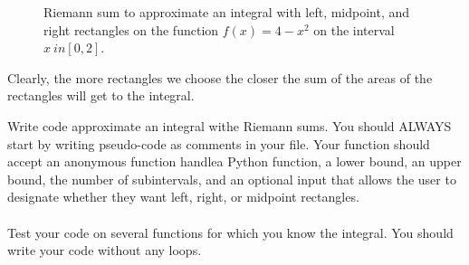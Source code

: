 \begin{figure}[ht!]
    \begin{center}
    \end{center}
    \caption{Riemann sum to approximate an integral with left, midpoint, and right
    rectangles on the function $f(x) = 4 - x^2$ on the interval $x \ in [0,2]$.}
    \label{fig:integral_with_rectangles}
\end{figure}

Clearly, the more rectangles we choose the closer the sum of the areas of the rectangles will get to the integral.
\begin{problem}
    Write \ProgLang code approximate an integral withe Riemann sums. You should ALWAYS start by writing pseudo-code as comments in your
    \ProgLang file.    Your \ProgLang function
    should accept \ifnum{} an anonymous function handle\else a Python function\fi, a lower bound, an upper bound, the number
    of subintervals, and an optional input that allows the user to designate whether they
    want left, right, or midpoint rectangles. \\
    \ifnum{}
    \else
    \fi
    \\
    Test your code on several functions for which you know the integral.  You should write
    your code without any  loops.
\end{problem}

